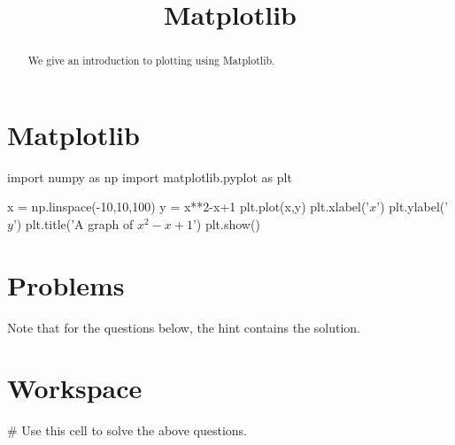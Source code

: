 \documentclass{ximera}
\title{Matplotlib}
\begin{document}
  
\begin{abstract}  
We give an introduction to plotting using Matplotlib.
\end{abstract}  
\maketitle

\section{Matplotlib}


\begin{sageCell}
import numpy as np
import matplotlib.pyplot as plt

x = np.linspace(-10,10,100)
y = x**2-x+1
plt.plot(x,y)
plt.xlabel('$x$')
plt.ylabel('$y$')
plt.title('A graph of $x^2-x+1$')
plt.show()
\end{sageCell}


\section{Problems}

Note that for the questions below, the hint contains the solution.

\begin{question}
\end{question}

\section{Workspace}

\begin{sageCell}
# Use this cell to solve the above questions.
\end{sageCell}
\end{document}
